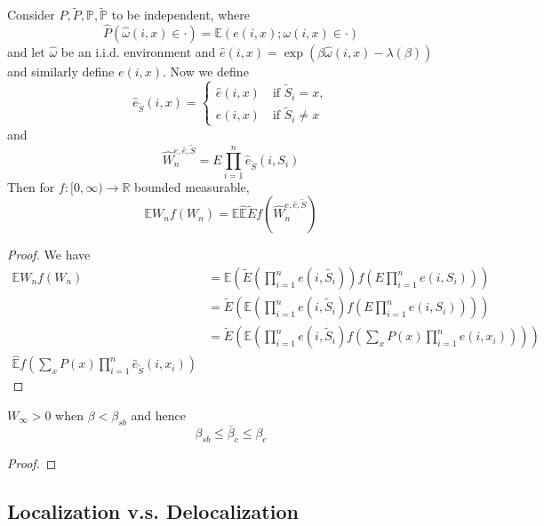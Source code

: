 \begin{proposition}
    Consider $P,\tilde{P},\mathbb{P},\tilde{\mathbb{P}}$ to be independent, where
    \[
    \hat{P}(\hat\omega(i,x) \in \cdot) = \mathbb{E}(e(i,x); \omega(i,x)\in \cdot)
    \] and let $\hat{\omega}$ be an i.i.d. environment and $\hat{e}(i,x) = \exp(\beta\hat{\omega}(i,x) - \lambda(\beta))$ and similarly define $e(i,x)$. Now we define
    \[
    \hat{e}_{\tilde{S}}(i,x) = \begin{cases}
        \hat{e}(i,x)\quad\text{if }\tilde{S}_i = x,\\
        e(i,x)\quad\text{if }\tilde{S}_i \neq x
    \end{cases}
    \]
    and
    \[
    \hat{W}_n^{e,\hat{e},\tilde{S}} = E\prod_{i=1}^n \hat{e}_{\tilde{S}}(i,S_i)
    \]
    Then for $f:[0,\infty) \to \mathbb{R}$ bounded measurable,
    \[
    \mathbb{E} W_nf(W_n) = \mathbb{E}\hat{\mathbb{E}} \tilde{E}f( \hat{W}_n^{e,\hat{e},\tilde{S}})
    \]
\end{proposition}
\begin{proof}
    We have
    \[
    \begin{aligned}
        \mathbb{E}W_n f(W_n) &= \mathbb{E}\left(\tilde{E}\left(\prod_{i=1}^n e(i,\tilde{S_i})\right)f\left(E\prod_{i=1}^n e(i,S_i)\right)\right) \\
        & = \tilde{E}\left(\mathbb{E}\left(\prod_{i=1}^n e(i,\tilde{S}_i) f\left(E\prod_{i=1}^n e(i,S_i)\right)\right)\right) \\
        &=\tilde{E}\left(\mathbb{E}\left(\prod_{i=1}^n e(i,\tilde{S}_i) f\left(\sum_{x} P(x)\prod_{i=1}^n e(i,x_i)\right)\right)\right) \\
        \hat{\mathbb{E}}f\left(\sum_{x} P(x)\prod_{i=1}^n \hat{e}_{\tilde{S}}(i,x_i)\right)
    \end{aligned}
    \]
\end{proof}

\begin{theorem}
    $W_{\infty} > 0$ when $\beta < \beta_{sb}$ and hence
    \[
    \beta_{sb} \leq \bar{\beta}_c \leq \beta_c
    \]
\end{theorem}
\begin{proof}
    
\end{proof}


\subsection{Localization v.s. Delocalization}


